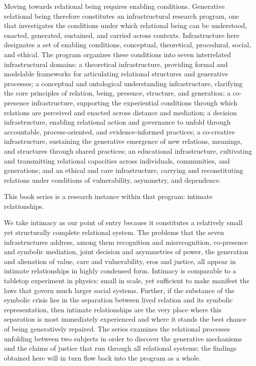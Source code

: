 \documentclass[11pt]{book}
\begin{document}
Moving towards relational being requires enabling conditions. Generative relational being therefore constitutes an infrastructural research program, one that investigates the conditions under which relational being can be understood, enacted, generated, sustained, and carried across contexts. Infrastructure here designates a set of enabling conditions, conceptual, theoretical, procedural, social, and ethical. The program organizes these conditions into seven interrelated infrastructural domains: a theoretical infrastructure, providing formal and modelable frameworks for articulating relational structures and generative processes; a conceptual and ontological understanding infrastructure, clarifying the core principles of relation, being, presence, structure, and generation; a co-presence infrastructure, supporting the experiential conditions through which relations are perceived and enacted across distance and mediation; a decision infrastructure, enabling relational action and governance to unfold through accountable, process-oriented, and evidence-informed practices; a co-creative infrastructure, sustaining the generative emergence of new relations, meanings, and structures through shared practices; an educational infrastructure, cultivating and transmitting relational capacities across individuals, communities, and generations; and an ethical and care infrastructure, carrying and reconstituting relations under conditions of vulnerability, asymmetry, and dependence.

This book series is a research instance within that program: intimate relationships.

We take intimacy as our point of entry because it constitutes a relatively small yet structurally complete relational system. The problems that the seven infrastructures address, among them recognition and misrecognition, co-presence and symbolic mediation, joint decision and asymmetries of power, the generation and alienation of value, care and vulnerability, eros and justice, all appear in intimate relationships in highly condensed form. Intimacy is comparable to a tabletop experiment in physics: small in scale, yet sufficient to make manifest the laws that govern much larger social systems. Further, if the substance of the symbolic crisis lies in the separation between lived relation and its symbolic representation, then intimate relationships are the very place where this separation is most immediately experienced and where it stands the best chance of being generatively repaired. The series examines the relational processes unfolding between two subjects in order to discover the generative mechanisms and the claims of justice that run through all relational systems; the findings obtained here will in turn flow back into the program as a whole.
\end{document}
